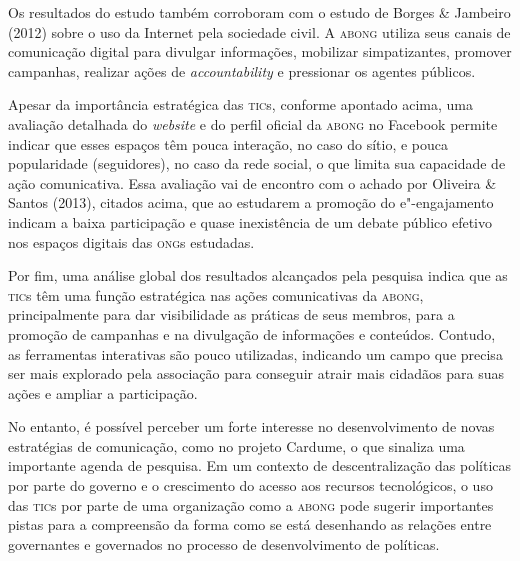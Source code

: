 Os resultados do estudo também corroboram com o estudo de Borges \&
Jambeiro (2012) sobre o uso da Internet pela sociedade civil. A \textsc{abong}
utiliza seus canais de comunicação digital para divulgar informações,
mobilizar simpatizantes, promover campanhas, realizar ações de
\textit{accountability} e pressionar os agentes públicos.

Apesar da importância estratégica das \textsc{tic}s, conforme apontado acima, uma
avaliação detalhada do \textit{website} e do perfil oficial da \textsc{abong} no Facebook
permite indicar que esses espaços têm pouca interação, no caso do sítio,
e pouca popularidade (seguidores), no caso da rede social, o que limita
sua capacidade de ação comunicativa. Essa avaliação vai de encontro com
o achado por Oliveira \& Santos (2013), citados acima, que ao estudarem
a promoção do e"-engajamento indicam a baixa participação e quase
inexistência de um debate público efetivo nos espaços digitais das \textsc{ong}s
estudadas.

Por fim, uma análise global dos resultados alcançados pela pesquisa
indica que as \textsc{tic}s têm uma função estratégica nas ações comunicativas da
\textsc{abong}, principalmente para dar visibilidade as práticas de seus membros,
para a promoção de campanhas e na divulgação de informações e conteúdos.
Contudo, as ferramentas interativas são pouco utilizadas, indicando um
campo que precisa ser mais explorado pela associação para conseguir
atrair mais cidadãos para suas ações e ampliar a participação.

No entanto, é possível perceber um forte interesse no desenvolvimento de
novas estratégias de comunicação, como no projeto Cardume, o que
sinaliza uma importante agenda de pesquisa. Em um contexto de
descentralização das políticas por parte do governo e o crescimento do
acesso aos recursos tecnológicos, o uso das \textsc{tic}s por parte de uma
organização como a \textsc{abong} pode sugerir importantes pistas para a
compreensão da forma como se está desenhando as relações entre
governantes e governados no processo de desenvolvimento de políticas.


